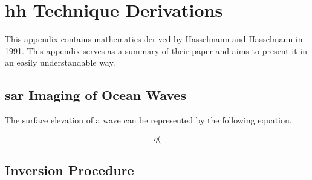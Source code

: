 \chapter{\ac{hh} Technique Derivations}
\label{ap:hh}


This appendix contains mathematics derived by Hasselmann and Hasselmann \cite{Hasselmann1991} in 1991. This appendix serves as a summary of their paper and aims to present it in an easily understandable way.

\section{\ac{sar} Imaging of Ocean Waves} \label{ap:hh.sarImaging}

The surface elevation of a wave can be represented by the following equation.

\begin{equation}
    \eta(
\end{equation}


\section{Inversion Procedure} \label{ap:hh.inversion}
